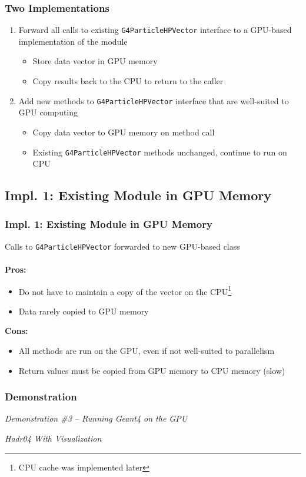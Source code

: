 \documentclass{beamer}
\newcommand\pro{\item[$+$]}
\newcommand\con{\item[$-$]}
\begin{document}
\begin{frame}
\frametitle{Two Implementations}
\begin{enumerate}
\item Forward all calls to existing \texttt{G4ParticleHPVector} interface to a GPU-based implementation of the module

\begin{itemize}
\item Store data vector in GPU memory
\item Copy results back to the CPU to return to the caller
\end{itemize}

\item Add new methods to \texttt{G4ParticleHPVector} interface that are well-suited to GPU computing
\begin{itemize}
\item Copy data vector to GPU memory on method call
\item Existing \texttt{G4ParticleHPVector} methods unchanged, continue to run on CPU
\end{itemize}
\end{enumerate}
\end{frame}

\subsection{Impl. 1: Existing Module in GPU Memory}
\begin{frame}
\frametitle{Impl. 1: Existing Module in GPU Memory}
Calls to \texttt{G4ParticleHPVector} forwarded to new GPU-based class\\~\\

\textbf{Pros:}
\begin{itemize}
\pro Do not have to maintain a copy of the vector on the CPU\footnote{CPU cache was implemented later}
\pro Data rarely copied to GPU memory
\end{itemize}
\textbf{Cons:}
\begin{itemize}
\con All methods are run on the GPU, even if not well-suited to parallelism
\con Return values must be copied from GPU memory to CPU memory (slow)
\end{itemize}
\end{frame}

\begin{frame}
\frametitle{Demonstration}
\begin{center}
\emph{Demonstration  \#3 -- Running Geant4 on the GPU}

\emph{Hadr04 With Visualization}

\end{center}
\end{frame}
\end{document}
